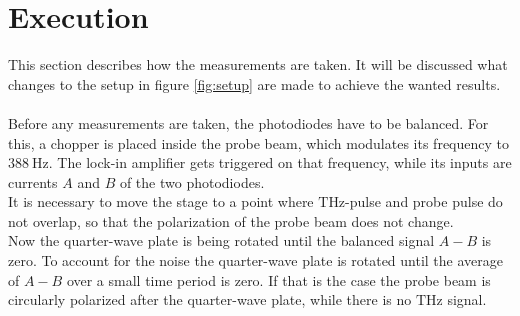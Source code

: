\section{Execution}
\label{sec:execution}
This section describes how the measurements are taken. 
It will be discussed what changes to the setup in figure \ref{fig:setup} are made to achieve the wanted results.
\\\\
Before any measurements are taken, the photodiodes have to be balanced.
For this, a chopper is placed inside the probe beam, which modulates its frequency to $\SI{388}{\hertz}$.
The lock-in amplifier gets triggered on that frequency, while its inputs are currents $A$ and $B$ of the two photodiodes.
\\
It is necessary to move the stage to a point where $\si{\tera\hertz}$-pulse and probe pulse do not overlap, so that the polarization of the probe beam does not change.
\\
Now the quarter-wave plate is being rotated until the balanced signal $A-B$ is zero.
To account for the noise the quarter-wave plate is rotated until the average of $A-B$ over a small time period is zero.
If that is the case the probe beam is circularly polarized after the quarter-wave plate, while there is no $\si{\tera\hertz}$ signal.
